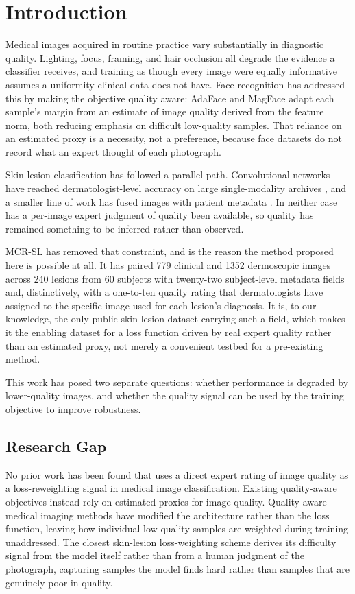 \documentclass[conference]{IEEEtran}
\begin{document}
\section{Introduction}
Medical images acquired in routine practice vary substantially in diagnostic quality. Lighting, focus, framing, and hair occlusion all degrade the evidence a classifier receives, and training as though every image were equally informative assumes a uniformity clinical data does not have. Face recognition has addressed this by making the objective quality aware: AdaFace \cite{adaface} and MagFace \cite{magface} adapt each sample's margin from an estimate of image quality derived from the feature norm, both reducing emphasis on difficult low-quality samples. That reliance on an estimated proxy is a necessity, not a preference, because face datasets do not record what an expert thought of each photograph.

Skin lesion classification has followed a parallel path. Convolutional networks have reached dermatologist-level accuracy on large single-modality archives \cite{esteva2017,ham10000}, and a smaller line of work has fused images with patient metadata \cite{metablock,paduf20}. In neither case has a per-image expert judgment of quality been available, so quality has remained something to be inferred rather than observed.

MCR-SL \cite{mcrsl} has removed that constraint, and is the reason the method proposed here is possible at all. It has paired 779 clinical and 1352 dermoscopic images across 240 lesions from 60 subjects with twenty-two subject-level metadata fields and, distinctively, with a one-to-ten quality rating that dermatologists have assigned to the specific image used for each lesion's diagnosis. It is, to our knowledge, the only public skin lesion dataset carrying such a field, which makes it the enabling dataset for a loss function driven by real expert quality rather than an estimated proxy, not merely a convenient testbed for a pre-existing method.

This work has posed two separate questions: whether performance is degraded by lower-quality images, and whether the quality signal can be used by the training objective to improve robustness.

\subsection{Research Gap}
No prior work has been found that uses a direct expert rating of image quality as a
loss-reweighting signal in medical image classification. Existing quality-aware objectives
instead rely on estimated proxies for image quality. Quality-aware medical imaging methods
have modified the architecture rather than the loss function, leaving how individual
low-quality samples are weighted during training unaddressed. The closest skin-lesion
loss-weighting scheme derives its difficulty signal from the model itself rather than from a
human judgment of the photograph, capturing samples the model finds hard rather than samples
that are genuinely poor in quality.
\end{document}
